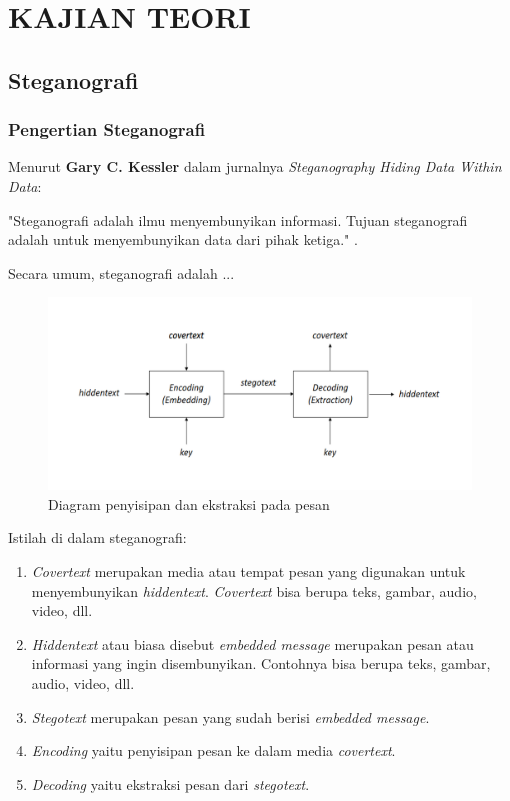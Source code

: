 
\chapter{KAJIAN TEORI}                

\section{Steganografi}
	\subsection{Pengertian Steganografi}
	Menurut \textbf{Gary C. Kessler} dalam jurnalnya \emph{Steganography Hiding Data Within Data}:
	
	"Steganografi adalah ilmu menyembunyikan informasi. Tujuan steganografi adalah untuk menyembunyikan data dari pihak ketiga." \cite{kessler}.
	
	Secara umum, steganografi adalah ...
	
	\begin{figure}[H]
		\centering
		\includegraphics[width=1\textwidth]{gambar/diagram_steganografi}
		\caption{Diagram penyisipan dan ekstraksi pada pesan}
		\label{diagram_steganografi}
	\end{figure} 
	
	Istilah di dalam steganografi:
	\begin{enumerate}
		\item \emph{Covertext} merupakan media atau tempat pesan yang digunakan untuk menyembunyikan \emph{hiddentext}. \emph{Covertext} bisa berupa teks, gambar, audio, video, dll.
		\item \emph{Hiddentext}	atau biasa disebut \emph{embedded message} merupakan pesan atau informasi yang ingin disembunyikan. Contohnya bisa berupa teks, gambar, audio, video, dll.
		\item \emph{Stegotext} merupakan pesan yang sudah berisi \emph{embedded message}.
		\item \emph{Encoding} yaitu penyisipan pesan ke dalam media \emph{covertext}.
		\item \emph{Decoding} yaitu ekstraksi pesan dari \emph{stegotext}.
	\end{enumerate}
	

